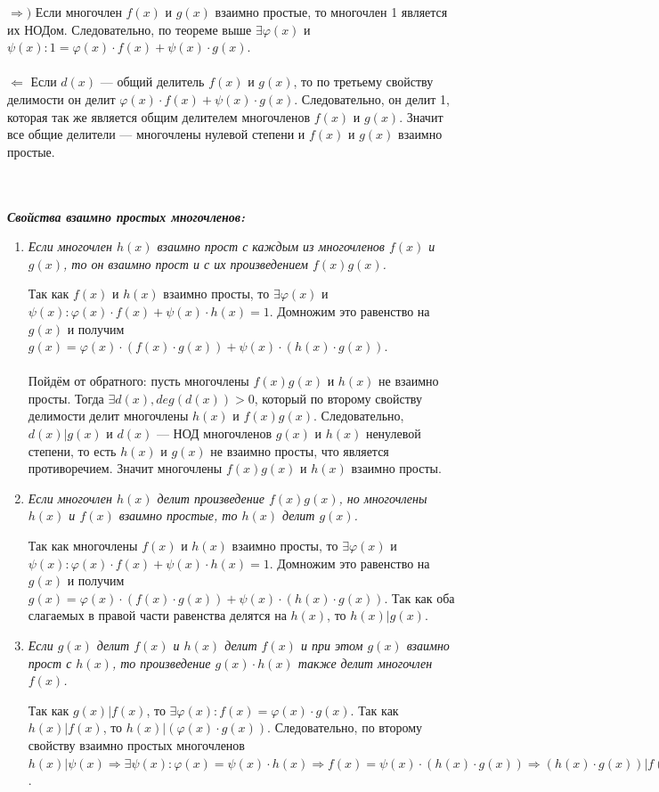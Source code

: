 \begin{Proof} 
	$\Rightarrow)$ Если многочлен $f(x)$ и $g(x)$ взаимно простые, то многочлен 1 является их НОДом. Следовательно, по теореме выше 
	$\exists \varphi(x)$ и $\psi(x): 1 = \varphi(x)\cdot f(x) + \psi(x)\cdot g(x).$\\\\
	$\Leftarrow$ Если $d(x)$ --- общий делитель $f(x)$ и $g(x)$, то по третьему свойству делимости он делит $\varphi(x)\cdot f(x) + 
	\psi(x)\cdot g(x)$. Следовательно, он делит 1, которая так же является общим делителем многочленов $f(x)$ и $g(x)$. Значит все общие делители 
	--- многочлены нулевой степени и $f(x)$ и $g(x)$ взаимно простые. 
\end{Proof}\\\\
\textit{\textbf{Свойства взаимно простых многочленов:}}
\begin{enumerate}
	\item  \textit{Если многочлен $h(x)$ взаимно прост с каждым из многочленов $f(x)$ и $g(x)$, то он взаимно прост и с их произведением $f(x)g(x)$.}
	\begin{Proof} 
		Так как $f(x)$ и $h(x)$ взаимно просты, то $\exists \varphi(x)$ и $\psi(x): \varphi(x)\cdot f(x) + \psi(x)\cdot h(x) = 1.$ Домножим это 
		равенство на $g(x)$ и получим $g(x) = \varphi(x)\cdot (f(x)\cdot g(x)) + \psi(x)\cdot (h(x)\cdot g(x)).$ \\\\
		Пойдём от обратного: пусть многочлены $f(x)g(x)$ и $h(x)$ не взаимно просты. Тогда $\exists d(x), deg(d(x)) > 0$, который по второму свойству делимости делит многочлены $h(x)$ и $f(x)g(x)$. Следовательно, $d(x)|g(x)$ и $d(x)$ --- НОД многочленов $g(x)$ и $h(x)$ ненулевой степени, то есть $h(x)$ и $g(x)$ не взаимно просты, что является противоречием. Значит многочлены $f(x)g(x)$ и $h(x)$ взаимно просты. 
	\end{Proof}
	\item \textit{Если многочлен $h(x)$ делит произведение $f(x)g(x)$, но многочлены $h(x)$ и $f(x)$ взаимно простые, то $h(x)$ делит $g(x)$.}
	\begin{Proof} 
		Так как многочлены $f(x)$ и $h(x)$ взаимно просты, то $\exists \varphi(x)$ и $\psi(x): \varphi(x)\cdot f(x) + \psi(x)\cdot h(x) = 1$. Домножим это 
		равенство на $g(x)$ и получим $g(x) = \varphi(x)\cdot(f(x)\cdot g(x)) + \psi(x)\cdot (h(x)\cdot g(x))$. Так как оба слагаемых в 
		правой части равенства делятся на $h(x)$, то $h(x)|g(x)$. 
	\end{Proof}
	\item \textit{Если $g(x)$ делит $f(x)$ и $h(x)$ делит $f(x)$ и при этом $g(x)$ взаимно прост с $h(x)$, то произведение $g(x)\cdot h(x)$ также делит многочлен $f(x)$.}
	\begin{Proof} 
		Так как $g(x)|f(x)$, то $\exists \varphi(x): f(x) = \varphi(x)\cdot g(x)$. Так как $h(x)|f(x)$, то $h(x)|(\varphi(x)\cdot g(x))$. Следовательно, по второму свойству 
		взаимно простых многочленов $h(x)|\psi(x) \Rightarrow \exists \psi(x): \varphi(x) = \psi(x)\cdot h(x) \Rightarrow f(x) = \psi(x)\cdot (h(x)\cdot g(x)) \Rightarrow 
		(h(x)\cdot g(x))|f(x)$. 
	\end{Proof}
\end{enumerate}

